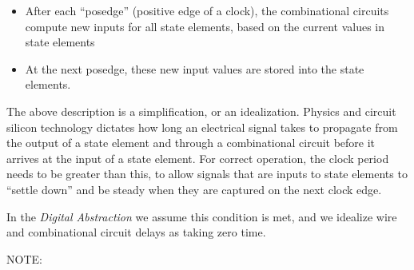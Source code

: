 \begin{itemize}

\item After each ``posedge'' (positive edge of a clock), the
      combinational circuits compute new inputs for all state
      elements, based on the current values in state elements

\item At the next posedge, these new input values are stored into the
      state elements.

\end{itemize}

The above description is a simplification, or an idealization.
Physics and circuit silicon technology dictates how long an electrical
signal takes to propagate from the output of a state element and
through a combinational circuit before it arrives at the input of a
state element.  For correct operation, the clock period needs to be
greater than this, to allow signals that are inputs to state elements
to ``settle down'' and be steady when they are captured on the next
clock edge.


In the \emph{Digital Abstraction} we assume this condition is met, and
we idealize wire and combinational circuit delays as taking zero time.


\vspace{1ex}

NOTE: 

